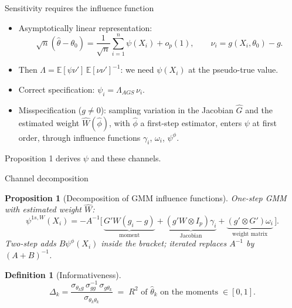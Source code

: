 \documentclass[11pt,aspectratio=169]{beamer}
\newtheorem{prop}{Proposition}
\newtheorem{defn}{Definition}
\newcommand{\E}{\mathbb{E}}
\newcommand{\assumbtn}{\hfill\hyperlink{jump:assum}{\beamerbutton{Assumption 1}}}
\newcommand{\notebtn}{\hyperlink{jump:notation}{\beamerbutton{Notation}}}
\begin{document}
\begin{frame}{Sensitivity requires the influence function}
    \begin{itemize}\setlength{\itemsep}{0.8em}
        \item Asymptotically linear representation:
              \[
                  \sqrt n(\widehat\theta-\theta_0)
                  =\frac{1}{\sqrt n}\sum_{i=1}^n\psi(X_i)+o_p(1),
                  \qquad
                  \nu_i=g(X_i,\theta_0)-g.
              \]
        \item Then $\Lambda=\E[\psi\nu']\,\E[\nu\nu']^{-1}$:
              we need $\psi(X_i)$ \alert{at the pseudo-true value}.
        \item Correct specification: $\psi_i=\Lambda_{AGS}\,\nu_i$.
        \item Misspecification ($g\neq0$): sampling variation in the Jacobian
              $\widehat G$ and the estimated weight $\widehat W(\widehat\phi)$,
              with $\widehat\phi$ a first-step estimator, enters $\psi$ at
              first order, through influence functions
              $\gamma_i$, $\omega_i$, $\psi^\phi$.
    \end{itemize}
    \vfill
    \centering
    \alert{Proposition 1 derives $\psi$ and these channels.}
\end{frame}

\begin{frame}{Channel decomposition}
    \hypertarget{jump:p1}{}
    \begin{prop}[Decomposition of GMM influence functions]
        One-step GMM with estimated weight $\widehat W$:
        \[
            \psi^{1s,W}(X_i)=-A^{-1}\big[\,
            \underbrace{G'W(g_i-g)}_{\text{moment}}
            +\underbrace{(g'W\otimes I_p)\gamma_i}_{\text{Jacobian}}
            +\underbrace{(g'\otimes G')\omega_i}_{\text{weight matrix}}\,\big].
        \]
        Two-step adds $B\psi^\phi(X_i)$ \emph{inside the bracket}; iterated
        replaces $A^{-1}$ by $(A+B)^{-1}$.
    \end{prop}
    \begin{defn}[Informativeness]
	\[
	\Delta_k=\frac{\sigma_{\theta_k g}\,\sigma_{gg}^{-1}\,\sigma_{g\theta_k}}
	{\sigma_{\theta_k\theta_k}}
	\;=\; R^2 \text{ of }\widehat\theta_k\text{ on the moments}
	\;\in[0,1].
	\]
\end{defn}
\end{frame}
\end{document}
